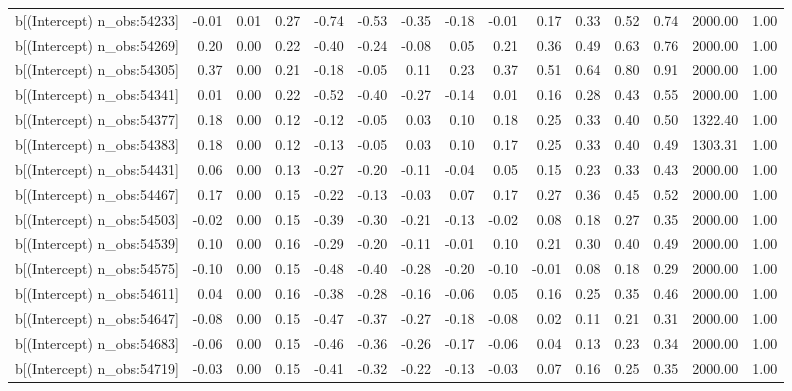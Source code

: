 \begin{table}[ht]
\begin{tabular}{rrrrrrrrrrrrrrr}
  b[(Intercept) n\_obs:54233] & -0.01 & 0.01 & 0.27 & -0.74 & -0.53 & -0.35 & -0.18 & -0.01 & 0.17 & 0.33 & 0.52 & 0.74 & 2000.00 & 1.00 \\ 
  b[(Intercept) n\_obs:54269] & 0.20 & 0.00 & 0.22 & -0.40 & -0.24 & -0.08 & 0.05 & 0.21 & 0.36 & 0.49 & 0.63 & 0.76 & 2000.00 & 1.00 \\ 
  b[(Intercept) n\_obs:54305] & 0.37 & 0.00 & 0.21 & -0.18 & -0.05 & 0.11 & 0.23 & 0.37 & 0.51 & 0.64 & 0.80 & 0.91 & 2000.00 & 1.00 \\ 
  b[(Intercept) n\_obs:54341] & 0.01 & 0.00 & 0.22 & -0.52 & -0.40 & -0.27 & -0.14 & 0.01 & 0.16 & 0.28 & 0.43 & 0.55 & 2000.00 & 1.00 \\ 
  b[(Intercept) n\_obs:54377] & 0.18 & 0.00 & 0.12 & -0.12 & -0.05 & 0.03 & 0.10 & 0.18 & 0.25 & 0.33 & 0.40 & 0.50 & 1322.40 & 1.00 \\ 
  b[(Intercept) n\_obs:54383] & 0.18 & 0.00 & 0.12 & -0.13 & -0.05 & 0.03 & 0.10 & 0.17 & 0.25 & 0.33 & 0.40 & 0.49 & 1303.31 & 1.00 \\ 
  b[(Intercept) n\_obs:54431] & 0.06 & 0.00 & 0.13 & -0.27 & -0.20 & -0.11 & -0.04 & 0.05 & 0.15 & 0.23 & 0.33 & 0.43 & 2000.00 & 1.00 \\ 
  b[(Intercept) n\_obs:54467] & 0.17 & 0.00 & 0.15 & -0.22 & -0.13 & -0.03 & 0.07 & 0.17 & 0.27 & 0.36 & 0.45 & 0.52 & 2000.00 & 1.00 \\ 
  b[(Intercept) n\_obs:54503] & -0.02 & 0.00 & 0.15 & -0.39 & -0.30 & -0.21 & -0.13 & -0.02 & 0.08 & 0.18 & 0.27 & 0.35 & 2000.00 & 1.00 \\ 
  b[(Intercept) n\_obs:54539] & 0.10 & 0.00 & 0.16 & -0.29 & -0.20 & -0.11 & -0.01 & 0.10 & 0.21 & 0.30 & 0.40 & 0.49 & 2000.00 & 1.00 \\ 
  b[(Intercept) n\_obs:54575] & -0.10 & 0.00 & 0.15 & -0.48 & -0.40 & -0.28 & -0.20 & -0.10 & -0.01 & 0.08 & 0.18 & 0.29 & 2000.00 & 1.00 \\ 
  b[(Intercept) n\_obs:54611] & 0.04 & 0.00 & 0.16 & -0.38 & -0.28 & -0.16 & -0.06 & 0.05 & 0.16 & 0.25 & 0.35 & 0.46 & 2000.00 & 1.00 \\ 
  b[(Intercept) n\_obs:54647] & -0.08 & 0.00 & 0.15 & -0.47 & -0.37 & -0.27 & -0.18 & -0.08 & 0.02 & 0.11 & 0.21 & 0.31 & 2000.00 & 1.00 \\ 
  b[(Intercept) n\_obs:54683] & -0.06 & 0.00 & 0.15 & -0.46 & -0.36 & -0.26 & -0.17 & -0.06 & 0.04 & 0.13 & 0.23 & 0.34 & 2000.00 & 1.00 \\ 
  b[(Intercept) n\_obs:54719] & -0.03 & 0.00 & 0.15 & -0.41 & -0.32 & -0.22 & -0.13 & -0.03 & 0.07 & 0.16 & 0.25 & 0.35 & 2000.00 & 1.00 \\ 

\end{tabular}
\end{table}
